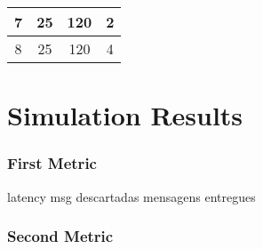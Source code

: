 \documentclass[conference]{IEEEtran}
\begin{document}
\begin{table}[ht]
\begin{tabular}{|c|c|c|c|}
7                                                           & 25                                                        & 120                                                                  & 2                                                            \\ \hline
8                                                           & 25                                                        & 120                                                                  & 4                                                            \\ \hline
\end{tabular}
\end{table}

\section{Simulation Results}

\subsubsection{First Metric}

latency
msg descartadas
mensagens entregues

\subsubsection{Second Metric}

%
%
\end{document}
